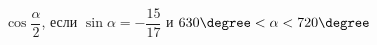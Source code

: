 \begin{ex}[type=simplify_calculate]
	\begin{condition}
		\( \cos\dfrac{\alpha}{2} \), \quad если \( \sin\alpha=-\dfrac{15}{17} \) и \( 630\degree<\alpha<720\degree \)
	\end{condition}
\end{ex}
